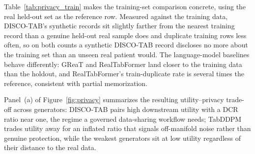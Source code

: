 Table~\ref{tab:privacy_train} makes the training-set comparison concrete, using the real held-out set as the reference row. Measured against the training data, DISCO-TAB's synthetic records sit slightly farther from the nearest training record than a genuine held-out real sample does and duplicate training rows less often, so on both counts a synthetic DISCO-TAB record discloses no more about the training set than an unseen real patient would. The language-model baselines behave differently: GReaT and RealTabFormer land closer to the training data than the holdout, and RealTabFormer's train-duplicate rate is several times the reference, consistent with partial memorization.



Panel~(a) of Figure~\ref{fig:privacy} summarizes the resulting utility--privacy trade-off across generators: DISCO-TAB pairs high downstream utility with a DCR ratio near one, the regime a governed data-sharing workflow needs; TabDDPM trades utility away for an inflated ratio that signals off-manifold noise rather than genuine protection, while the weakest generators sit at low utility regardless of their distance to the real data.
